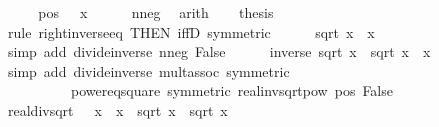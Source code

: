 \begin{isabellebody}
\ \ \isamarkupfalse%
\ \isamarkupfalse%
\ pos{\isacharcolon}{\kern0pt}\ {\isachardoublequoteopen}{}\ {\isacharless}{\kern0pt}\ x{\isachardoublequoteclose}\isanewline
\ \ \ \ \isamarkupfalse%
\ nneg\ \isamarkupfalse%
\ arith\isanewline
\ \ \isamarkupfalse%
\ {\isacharquery}{\kern0pt}thesis\isanewline
\ \ \isamarkupfalse%
\ {\isacharparenleft}{\kern0pt}rule\ right{\isacharunderscore}{\kern0pt}inverse{\isacharunderscore}{\kern0pt}eq\ {\isacharbrackleft}{\kern0pt}THEN\ iffD{}{\isacharcomma}{\kern0pt}\ symmetric{\isacharbrackright}{\kern0pt}{\isacharparenright}{\kern0pt}\isanewline
\ \ \ \ \isamarkupfalse%
\ {\isachardoublequoteopen}sqrt\ x\ {\isacharslash}{\kern0pt}\ x\ {\isasymnoteq}\ {}{\isachardoublequoteclose}\isanewline
\ \ \ \ \ \ \isamarkupfalse%
\ {\isacharparenleft}{\kern0pt}simp\ add{\isacharcolon}{\kern0pt}\ divide{\isacharunderscore}{\kern0pt}inverse\ nneg\ False{\isacharparenright}{\kern0pt}\isanewline
\ \ \ \ \isamarkupfalse%
\ {\isachardoublequoteopen}inverse\ {\isacharparenleft}{\kern0pt}sqrt\ x{\isacharparenright}{\kern0pt}\ {\isacharslash}{\kern0pt}\ {\isacharparenleft}{\kern0pt}sqrt\ x\ {\isacharslash}{\kern0pt}\ x{\isacharparenright}{\kern0pt}\ {\isacharequal}{\kern0pt}\ {}{\isachardoublequoteclose}\isanewline
\ \ \ \ \ \ \isamarkupfalse%
\ {\isacharparenleft}{\kern0pt}simp\ add{\isacharcolon}{\kern0pt}\ divide{\isacharunderscore}{\kern0pt}inverse\ mult{\isachardot}{\kern0pt}assoc\ {\isacharbrackleft}{\kern0pt}symmetric{\isacharbrackright}{\kern0pt}\isanewline
\ \ \ \ \ \ \ \ \ \ power{}{\isacharunderscore}{\kern0pt}eq{\isacharunderscore}{\kern0pt}square\ {\isacharbrackleft}{\kern0pt}symmetric{\isacharbrackright}{\kern0pt}\ real{\isacharunderscore}{\kern0pt}inv{\isacharunderscore}{\kern0pt}sqrt{\isacharunderscore}{\kern0pt}pow{}\ pos\ False{\isacharparenright}{\kern0pt}\isanewline
\ \ \isamarkupfalse%
\isanewline
{}\isamarkupfalse%
%
\endisatagproof
{\isafoldproof}%
%
\isadelimproof
\isanewline
%
\endisadelimproof
\isanewline
{}\isamarkupfalse%
\ real{\isacharunderscore}{\kern0pt}div{\isacharunderscore}{\kern0pt}sqrt{\isacharcolon}{\kern0pt}\ {\isachardoublequoteopen}{}\ {\isasymle}\ x\ {\isasymLongrightarrow}\ x\ {\isacharslash}{\kern0pt}\ sqrt\ x\ {\isacharequal}{\kern0pt}\ sqrt\ x{\isachardoublequoteclose}\isanewline
%
\isadelimproof
\ \ %
\endisadelimproof

\end{isabellebody}
